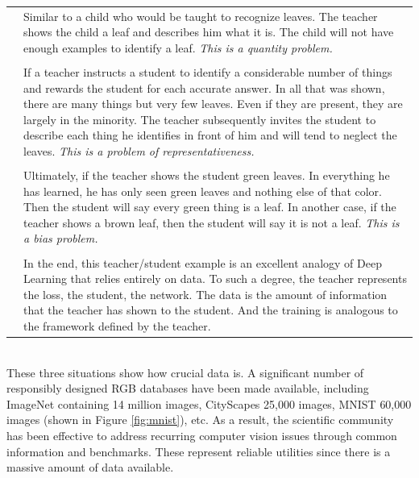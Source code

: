 {
	\begin{tabular}[h]{p{}!{\color{gray}\vrule width 2pt}p{0.93\textwidth}}
		&Similar to a child who would be taught to recognize leaves. The teacher shows the child a leaf and describes him what it is. The child will not have enough examples to identify a leaf. \emph{This is a quantity problem.}\\
		&\\
		
		&If a teacher instructs a student to identify a considerable number of things and rewards the student for each accurate answer. In all that was shown, there are many things but very few leaves. Even if they are present, they are largely in the minority. The teacher subsequently invites the student to describe each thing he identifies in front of him and will tend to neglect the leaves. \emph{This is a problem of representativeness.}\\
		&\\
		
		&Ultimately, if the teacher shows the student green leaves. In everything he has learned, he has only seen green leaves and nothing else of that color. Then the student will say every green thing is a leaf. In another case, if the teacher shows a brown leaf, then the student will say it is not a leaf. \emph{This is a bias problem.}\\
		&\\
		&In the end, this teacher/student example is an excellent analogy of Deep Learning that relies entirely on data. To such a degree, the teacher represents the loss, the student, the network. The data is the amount of information that the teacher has shown to the student. And the training is analogous to the framework defined by the teacher.\\
	\end{tabular}
}\\



These three situations show how crucial data is. A significant number of responsibly designed RGB databases have been made available, including ImageNet \cite{imagenet_cvpr09} containing 14 million images, CityScapes \cite{Cordts2016Cityscapes} 25,000 images, MNIST \cite{lecun-mnisthandwrittendigit-2010} 60,000 images (shown in Figure \ref{fig:mnist}), etc.
As a result, the scientific community has been effective to address recurring computer vision issues through common information and benchmarks. These represent reliable utilities since there is a massive amount of data available.


